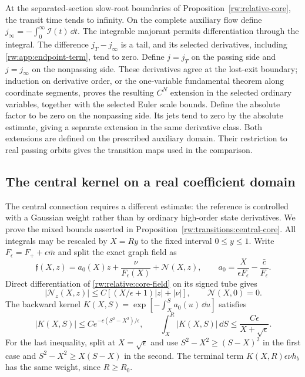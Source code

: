 At the separated-section slow-root boundaries of
Proposition~\ref{rw:relative-core}, the transit time tends to infinity.
On the complete auxiliary flow define
$j_\infty=-\int_0^\infty\mathcal I(t)\,\dd t$.
The integrable majorant permits differentiation through the integral.
The difference $j_T-j_\infty$ is a tail, and its selected derivatives,
including \eqref{rw:app:endpoint-term}, tend to zero. Define $j=j_T$
on the passing side and $j=j_\infty$ on the nonpassing side. These
derivatives agree at the lost-exit boundary; induction on derivative
order, or the one-variable fundamental theorem along coordinate
segments, proves the resulting $C^N$ extension in the selected ordinary
variables, together with the selected Euler scale bounds. Define the absolute
factor to be zero on the nonpassing side. Its jets tend to zero by
the absolute estimate, giving a separate extension in the same derivative
class.  Both extensions are defined on the prescribed auxiliary domain.
Their restriction to real passing orbits gives the transition maps
used in the comparison.

\subsection{The central kernel on a real coefficient domain}
\label{rw:app:relative-core}

The central connection requires a different estimate: the reference
is controlled with a Gaussian weight rather than by ordinary
high-order state derivatives.  We prove the mixed bounds asserted in
Proposition~\ref{rw:transitions:central-core}.  All integrals may be
rescaled by $X=Ry$ to the fixed interval $0\le y\le1$. Write
$F_\epsilon=F_++\epsilon\bar m$ and split the exact graph field as
\[
 \mathfrak f(X,z)=a_0(X)z+\frac{\nu}{F_\epsilon(X)}+\mathcal N(X,z),
 \qquad a_0=\frac{X}{\epsilon F_\epsilon}-\frac{\bar c}{F_\epsilon}.
\]
Direct differentiation of \eqref{rw:relative:core-field} on its
signed tube gives
\begin{equation}\label{rw:app:core-nonlinearity}
 |\mathcal N_z(X,z)|\le C[(X/\epsilon+1)|z|+|\nu|],
 \qquad \mathcal N(X,0)=0.
\end{equation}
The backward kernel
$K(X,S)=\exp[-\int_X^S a_0(u)\,\dd u]$ satisfies
\begin{equation}\label{rw:app:gaussian-kernel}
 |K(X,S)|\le Ce^{-c(S^2-X^2)/\epsilon},\qquad
 \int_X^R|K(X,S)|\,\dd S
          \le\frac{C\epsilon}{X+\sqrt\epsilon}.
\end{equation}
For the last inequality, split at $X=\sqrt\epsilon$ and use
$S^2-X^2\ge(S-X)^2$ in the first case and
$S^2-X^2\ge X(S-X)$ in the second. The terminal term
$K(X,R)\epsilon\nu h_b$ has the same weight, since $R\ge R_0$.

